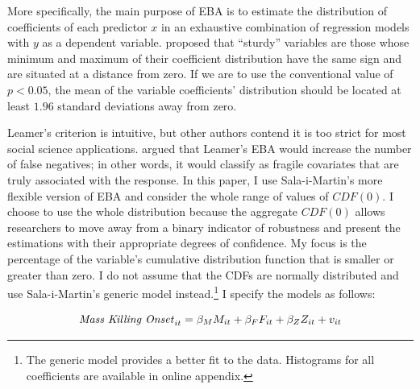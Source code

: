\documentclass[a4paper,12pt]{article}
\begin{document}
More specifically, the main purpose of EBA is to estimate the distribution of coefficients of each predictor $x$ in an exhaustive combination of regression models with $y$ as a dependent variable. \cite[308]{leamer1985sensitivity} proposed that ``sturdy'' variables are those whose minimum and maximum of their coefficient distribution have the same sign and are situated at a distance from zero. If we are to use the conventional value of $p < 0.05$, the mean of the variable coefficients' distribution should be located at least $1.96$ standard deviations away from zero. 
	
Leamer's criterion is intuitive, but other authors contend it is too strict for most social science applications. \cite{sala1997just} argued that Leamer's EBA would increase the number of false negatives; in other words, it would classify as fragile covariates that are truly associated with the response. In this paper, I use Sala-i-Martin's \citeyear{sala1997just} more flexible version of EBA and consider the whole range of values of $CDF(0)$. I choose to use the whole distribution because the aggregate $CDF(0)$ allows researchers to move away from a binary indicator of robustness and present the estimations with their appropriate degrees of confidence. My focus is the percentage of the variable's cumulative distribution function that is smaller or greater than zero. I do not assume that the CDFs are normally distributed and use Sala-i-Martin's generic model instead.\footnote{The generic model provides a better fit to the data. Histograms for all coefficients are available in online appendix.} I specify the models as follows:
	
\begin{equation}
\text{\textit{Mass Killing Onset}}_{it} = \beta_{M}M_{it} + \beta_{F}F_{it} + \beta_{Z}Z_{it} + v_{it}
\end{equation}
	
\end{document}
